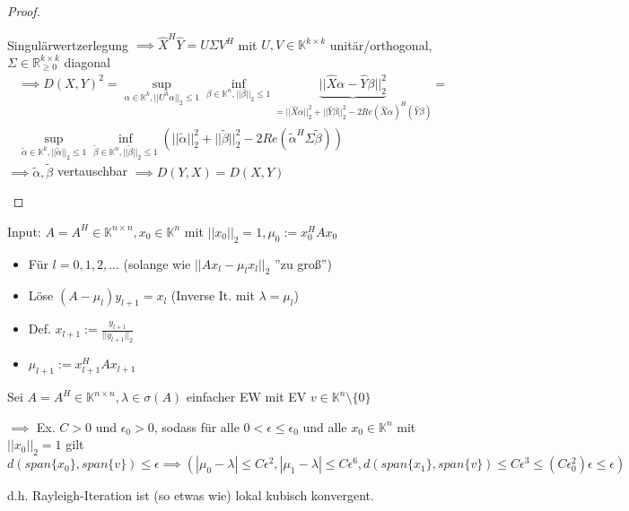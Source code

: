 \begin{proof}
\begin{enumerate}
		Singulärwertzerlegung $\implies \hat{X}^H \hat{Y} = U\Sigma V^H$ mit $U,V \in \mathbb{K}^{k\times k}$ unitär/orthogonal, $\Sigma \in \mathbb{R}_{\geq 0}^{k \times k}$ diagonal
		\begin{align*}
			\implies D(X,Y)^2 = \sup_{\alpha \in \mathbb{K}^k, ||U^h\alpha||_2 \leq 1}  \inf_{\beta \in \mathbb{K}^n, ||\beta||_2 \leq 1} \underbrace{||\hat{X}\alpha - \hat{Y}\beta||_2^2}_{= ||\hat{X}\alpha||_2^2 + ||\hat{Y}\beta||_2^2 - 2Re(\hat{X}\alpha)^H (\hat{Y}\beta)} =\\
			\sup_{\tilde{\alpha} \in \mathbb{K}^k, ||\tilde{\alpha}||_2 \leq 1} \inf_{\tilde{\beta} \in \mathbb{K}^n, ||\tilde{\beta}||_2 \leq 1} (||\tilde{\alpha}||_2^2 + ||\tilde{\beta}||_2^2 - 2Re(\tilde{\alpha}^H \Sigma \tilde{\beta}))
		\end{align*}
		$\implies \tilde{\alpha}, \tilde{\beta}$ vertauschbar $\implies D(Y,X)=D(X,Y)$
	\end{enumerate}
\end{proof}

\begin{algorithm}
	Input: $A=A^H \in \mathbb{K}^{n\times n}, x_0 \in \mathbb{K}^n$ mit $||x_0||_2=1, \mu_0 := x_0^HAx_0$
	
	\begin{itemize}
		\item Für $l=0,1,2,...$ (solange wie $||Ax_l - \mu_l x_l||_2$ ''zu groß'')
		\item \hspace{0.5cm} Löse $(A-\mu_l)y_{l+1} = x_l$ (Inverse It. mit $\lambda=\mu_l$)
		\item \hspace{0.5cm} Def. $x_{l+1} := \frac{y_{l+1}}{||y_{l+1}||_2}$
		\item \hspace{0.5cm} $\mu_{l+1} := x_{l+1}^HAx_{l+1}$
	\end{itemize}
\end{algorithm}

\begin{theorem}
	Sei $A = A^H \in \mathbb{K}^{n\times n}, \lambda \in \sigma(A)$ einfacher EW mit EV $v \in \mathbb{K}^n\setminus\{0\}$
	
	$\implies$ Ex. $C>0$ und $\epsilon_0 > 0$, sodass für alle $0 < \epsilon \leq \epsilon_0$ und alle $x_0 \in \mathbb{K}^n$ mit $||x_0||_2 = 1$ gilt $d(span\{x_0\}, span\{v\}) \leq \epsilon \implies (|\mu_0 - \lambda| \leq C \epsilon^2, |\mu_1 - \lambda| \leq C \epsilon^6, d(span\{x_1\}, span\{v\}) \leq C \epsilon^3 \leq (C\epsilon_0^2)\epsilon \leq \epsilon)$
	
	d.h. Rayleigh-Iteration ist (so etwas wie) lokal kubisch konvergent.
\end{theorem}

